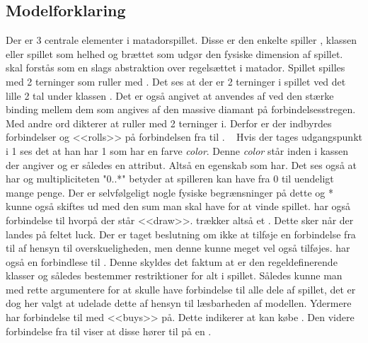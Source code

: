 \subsection{Modelforklaring}\label{chap:domain:sec:modelForklaring}
Der er 3 centrale elementer i matadorspillet. Disse er den enkelte spiller , klassen  eller spillet som helhed og brættet som udgør den fysiske dimension af spillet.  skal forstås som en slags abstraktion over regelsættet i matador. Spillet spilles med 2 terninger  som  ruller med . Det ses at der er 2 terninger i spillet ved det lille 2 tal under klassen . Det er også angivet at  anvendes af  ved den stærke binding mellem dem som angives af den massive diamant på forbindelsesstregen. Med andre ord dikterer  at  ruller  med 2 terninger i. Derfor er der indbyrdes forbindelser og <<rolls>> på forbindelsen fra  til . \
\linebreak
Hvis der tages udgangspunkt i 1  ses det at han har 1  som har en farve \textit{color}. Denne \textit{color} står inden i kassen der angiver  og er således en attribut. Altså en egenskab som  har. Det ses også at  har  og multipliciteten "0..*" betyder at spilleren kan have fra 0 til uendeligt mange penge. Der er selvfølgeligt nogle fysiske begrænsninger på dette og * kunne også skiftes ud med den sum man skal have for at vinde spillet.  har også forbindelse til  hvorpå der står <<draw>>.  trækker altså et . Dette sker når der landes på feltet luck. Der er taget beslutning om ikke at tilføje en forbindelse fra  til  af hensyn til overskueligheden, men denne kunne meget vel også tilføjes.  har også en forbindlese til . Denne skyldes det faktum at  er den regeldefinerende klasser og således bestemmer restriktioner for alt i spillet. Således kunne man med rette argumentere for at  skulle have forbindelse til alle dele af spillet, det er dog her valgt at udelade dette af hensyn til læsbarheden af modellen. Ydermere har  forbindelse til  med <<buys>> på. Dette indikerer at  kan købe . Den videre forbindelse fra  til  viser at disse hører til på en . \
